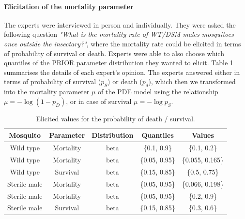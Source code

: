\documentclass[]{bmcart}
\begin{document}
\begin{backmatter}
\paragraph{Elicitation of the mortality parameter}
The experts were interviewed in person and individually. They were asked the following question \emph{"What is the mortality rate of WT/DSM males mosquitoes once outside the insectary?"}, where the mortality rate could be elicited in terms of probability of  survival or death. Experts were able to also choose which quantiles of the PRIOR  parameter distribution they wanted to elicit. Table \ref{tble:elicit_mort} summarises the details of each expert's opinion. The experts answered either in terms of probability of survival ($p_S$) or  death ($p_d$), which then we transformed into the mortality parameter $\mu$ of the PDE model using the relationship $\mu = - \log( 1-p_D)$, or in case of survival $\mu = -\log p_S$.
\begin{table}[h]
\centering
\begin{tabular}{|c|cccc|}
\hline
Mosquito & Parameter & Distribution & Quantiles & Values  \\\hline
Wild type & Mortality & beta & \{0.1, 0.9\} & \{0.1, 0.2\}\\
Wild type & Mortality & beta & \{0.05, 0.95\} & \{0.055, 0.165\}\\
Wild type & Survival & beta & \{0.15, 0.85\} & \{0.5, 0.75\}\\
Sterile male & Mortality & beta & \{0.05, 0.95\} & \{0.066, 0.198\}\\
Sterile male & Mortality & beta & \{0.05, 0.95\} & \{0.2, 0.9\}\\
Sterile male & Survival & beta & \{0.15, 0.85\} & \{0.3, 0.6\}\\
\hline
\end{tabular}
\caption{\label{tble:elicit_mort} Elicited values for the probability of death / survival. }
\end{table}



\end{backmatter}
\end{document}
